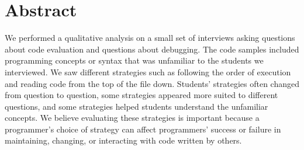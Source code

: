 \section{Abstract}
We performed a qualitative analysis on a small set of interviews asking questions about code evaluation and questions about debugging.
The code samples included programming concepts or syntax that was unfamiliar to the students we interviewed.
We saw different strategies such as following the order of execution and reading code from the top of the file down. Students' strategies often changed from question to question, some strategies appeared more suited to different questions, and some strategies helped students understand the unfamiliar concepts.
We believe evaluating these strategies is important because a programmer's choice of strategy can affect programmers' success or failure in maintaining, changing, or interacting with code written by others.
